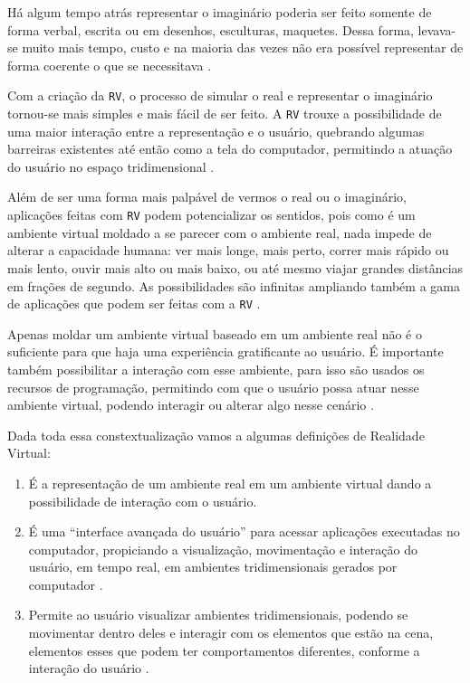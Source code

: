 Há algum tempo atrás representar o imaginário poderia ser feito somente de forma verbal, escrita ou  em desenhos, esculturas, maquetes. Dessa forma, levava-se muito mais tempo, custo e na maioria das vezes não era possível representar de forma coerente o que se necessitava \cite{kirner2006}.

Com a criação da \verb'RV', o processo de simular o real e representar o imaginário tornou-se mais simples e mais fácil de ser feito. A \verb'RV' trouxe a possibilidade de uma maior interação entre a representação e o usuário, quebrando algumas barreiras existentes até então como a tela do computador, permitindo a atuação do usuário no espaço tridimensional \cite{kirner2006}.

Além de ser uma forma mais palpável de vermos o real ou o imaginário, aplicações feitas com \verb'RV' podem potencializar os sentidos, pois como é um ambiente virtual moldado a se parecer com o ambiente real, nada impede de alterar a capacidade humana: ver mais longe, mais perto, correr mais rápido ou mais lento, ouvir mais alto ou mais baixo, ou até mesmo viajar grandes distâncias em frações de segundo. As possibilidades são infinitas ampliando também a gama de aplicações que podem ser feitas com a \verb'RV' \cite{kirner2006}.

Apenas moldar um ambiente virtual baseado em um ambiente real não é o suficiente para que haja uma experiência gratificante ao usuário. É importante também possibilitar a interação com esse ambiente, para isso são usados os recursos de programação, permitindo com que o usuário possa atuar nesse ambiente virtual, podendo interagir ou alterar algo nesse cenário \cite{kirner2006}.

Dada toda essa constextualização vamos a algumas definições de Realidade Virtual:
\begin{enumerate}
    \item É a representação de um ambiente real em um ambiente virtual dando a possibilidade de interação com o usuário.
    \item É uma “interface avançada do usuário” para acessar aplicações executadas no computador, propiciando a visualização, movimentação e interação do usuário, em tempo real, em ambientes tridimensionais gerados por computador \cite{kirner2006,kirner2007}.
    \item Permite ao usuário visualizar ambientes tridimensionais, podendo se movimentar dentro deles e interagir com os elementos que estão na cena, elementos esses que podem ter comportamentos diferentes, conforme a interação do usuário \cite{kirner2006}.
\end{enumerate}

